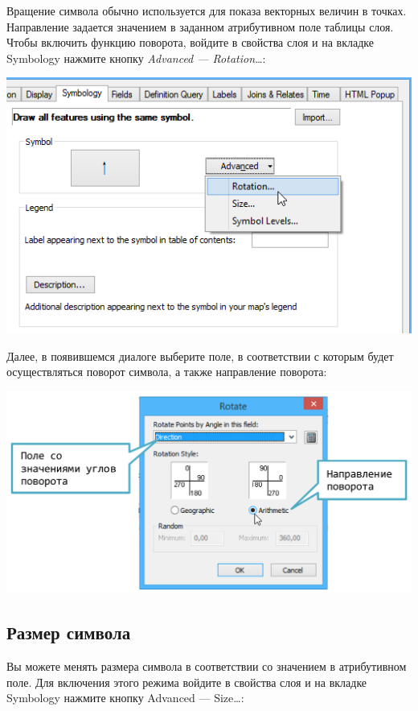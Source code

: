\documentclass[]{book}
\theoremstyle{definition}
\theoremstyle{definition}
\theoremstyle{definition}
\theoremstyle{remark}
\begin{document}
Вращение символа обычно используется для показа векторных величин в
точках. Направление задается значением в заданном атрибутивном поле
таблицы слоя. Чтобы включить функцию поворота, войдите в свойства слоя и
на вкладке Symbology нажмите кнопку \emph{Advanced ---
Rotation\ldots{}}:

\includegraphics{images/Appendix/image27.png}

Далее, в появившемся диалоге выберите поле, в соответствии с которым
будет осуществляться поворот символа, а также направление поворота:

\includegraphics{images/Appendix/image28.png}

\hypertarget{-}{%
\subsection{Размер символа}\label{-}}

Вы можете менять размера символа в соответствии со значением в
атрибутивном поле. Для включения этого режима войдите в свойства слоя и
на вкладке Symbology нажмите кнопку Advanced --- Size\ldots{}:
\end{document}
